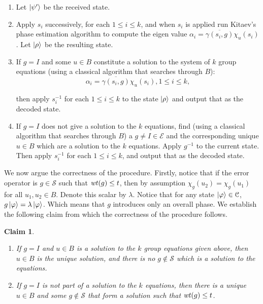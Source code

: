 \documentclass{Rinton-P9x6}
\newtheorem{claim}[theorem]{Claim}
\newcommand {\ket} [1] {\ensuremath \left\vert#1\ensuremath \right\rangle}
\newcommand{\wt}{{\it wt}}
\newcommand{\C}{{\ensuremath{\mathcal{C}}}}
\renewcommand{\S}{{\ensuremath{\mathcal{S}}}}
\newcommand{\E}{{\ensuremath{\mathcal{E}}}}
\begin{document}
\begin{enumerate}
\item Let $\ket{\psi'}$ be the received state.
  
\item Apply $s_i$ successively, for each $1\leq i\leq k$, and when
  $s_i$ is applied run Kitaev's phase estimation algorithm to compute
  the eigen value $\alpha_i=\overline{\gamma(s_i,g)}\chi_u(s_i)$. Let
  $\ket{\rho}$ be the resulting state.
  
\item If $g=I$ and some $u\in B$ constitute a solution to the system
  of $k$ group equations (using a classical algorithm that searches
  through $B$):
\[
\alpha_i=\overline{\gamma(s_i,g)}\chi_u(s_i), 1\leq i\leq k,
\]

then apply $s_i^{-1}$ for each $1\leq i\leq k$ to the state
$\ket{\rho}$ and output that as the decoded state.

\item If $g=I$ does not give a solution to the $k$ equations, find
  (using a classical algorithm that searches through $B$) a $g\neq
  I\in\E$ and the corresponding unique $u\in B$ which are a solution
  to the $k$ equations.  Apply $g^{-1}$ to the current state. Then
  apply $s_i^{-1}$ for each $1\leq i\leq k$, and output that as the
  decoded state.
\end{enumerate}

We now argue the correctness of the procedure. Firstly, notice that if
the error operator is $g\in\S$ such that $\wt(g)\leq t$, then by
assumption $\chi_g(u_2) = \chi_g(u_1)$  for all $u_1,u_2 \in
B$. Denote this scalar by $\lambda$. Notice that for any state
$\ket{\varphi}\in\C$, $g\ket{\varphi}=\lambda\ket{\varphi}$. Which
means that $g$ introduces only an overall phase. We establish the
following claim from which the correctness of the procedure follows.

\begin{claim}\label{decodeproof}
\begin{enumerate}
\item If $g=I$ and $u\in B$ is a solution to the $k$ group equations
  given above, then $u\in B$ is the unique solution, and there is no
  $g\not\in\S$ which is a solution to the equations.
\item If $g=I$ is not part of a solution to the $k$ equations, then
  there is a unique $u\in B$ and some $g\not\in\S$ that form a
  solution such that $\wt(g)\leq t$.
\end{enumerate}
\end{claim}
\end{document}
